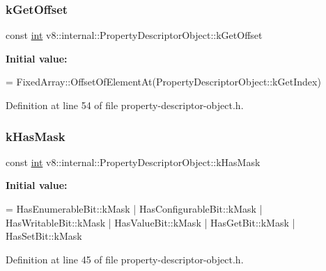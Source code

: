 \subsubsection{\texorpdfstring{k\+Get\+Offset}{kGetOffset}}
{\footnotesize\ttfamily const \mbox{\hyperlink{classint}{int}} v8\+::internal\+::\+Property\+Descriptor\+Object\+::k\+Get\+Offset\hspace{0.3cm}{\ttfamily [static]}}

{\bfseries Initial value\+:}
\begin{DoxyCode}
=
      FixedArray::OffsetOfElementAt(PropertyDescriptorObject::kGetIndex)
\end{DoxyCode}


Definition at line 54 of file property-\/descriptor-\/object.\+h.

\mbox{\label{classv8_1_1internal_1_1PropertyDescriptorObject_a34702615e9a979d4d39e7c978b724ca7}} 
\subsubsection{\texorpdfstring{k\+Has\+Mask}{kHasMask}}
{\footnotesize\ttfamily const \mbox{\hyperlink{classint}{int}} v8\+::internal\+::\+Property\+Descriptor\+Object\+::k\+Has\+Mask\hspace{0.3cm}{\ttfamily [static]}}

{\bfseries Initial value\+:}
\begin{DoxyCode}
= HasEnumerableBit::kMask |
                              HasConfigurableBit::kMask |
                              HasWritableBit::kMask | HasValueBit::kMask |
                              HasGetBit::kMask | HasSetBit::kMask
\end{DoxyCode}


Definition at line 45 of file property-\/descriptor-\/object.\+h.

\mbox{\label{classv8_1_1internal_1_1PropertyDescriptorObject_a455b93ac0aecd8df0694693c66955aaa}} 
